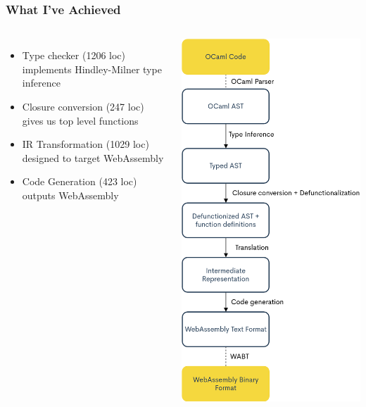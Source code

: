 \documentclass[12pt]{beamer}
\begin{document}
	\begin{frame}
		\frametitle{What I've Achieved}
		\begin{columns}
			\begin{itemize}
				\item Type checker (1206 loc) implements Hindley-Milner type inference
				\item Closure conversion (247 loc) gives us top level functions
				\item IR Transformation (1029 loc) designed to target WebAssembly
				\item Code Generation (423 loc) outputs WebAssembly
			\end{itemize}
			
			\begin{center}
				\includegraphics[width=0.55\linewidth]{otwa-diagram}
			\end{center}
		\end{columns}
	\end{frame}
\end{document}
